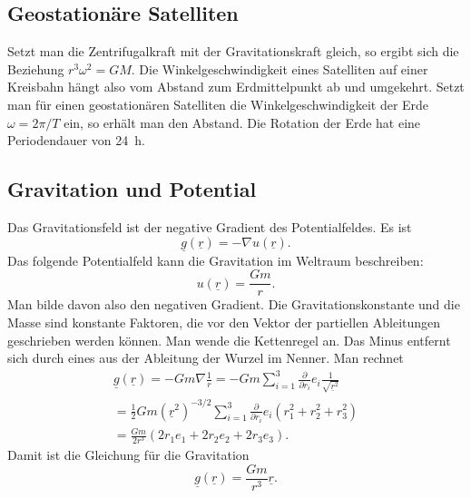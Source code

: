 \documentclass[a4paper,10pt,fleqn,twocolumn,twoside]{article}
\begin{document}
\subsection{Geostationäre Satelliten}

Setzt man die Zentrifugalkraft mit der Gravitationskraft gleich,
so ergibt sich die Beziehung \(r^3\omega^2=GM\). Die
Winkelgeschwindigkeit eines Satelliten auf einer Kreisbahn hängt also
vom Abstand zum Erdmittelpunkt ab und umgekehrt. Setzt man für einen
geostationären Satelliten die Winkelgeschwindigkeit der Erde
\(\omega=2\pi/T\) ein, so erhält man den Abstand. Die Rotation der
Erde hat eine Periodendauer von 24~h.

\subsection{Gravitation und Potential}

Das Gravitationsfeld ist der negative Gradient des Potentialfeldes.
Es ist
\[\underline g(\underline r) = -\nabla u(\underline r).\]
Das folgende Potentialfeld kann die Gravitation im Weltraum
beschreiben:
\[u(\underline r) = \frac{Gm}{r}.\]
Man bilde davon also den negativen Gradient. Die Gravitationskonstante
und die Masse sind konstante Faktoren, die vor den Vektor der
partiellen Ableitungen geschrieben werden können. Man wende die
Kettenregel an. Das Minus entfernt sich durch eines aus der
Ableitung der Wurzel im Nenner. Man rechnet
\begin{gather*}
\underline g(\underline r)
= -Gm\nabla\frac{1}{r}
= -Gm\sum_{i=1}^3 \frac{\partial}{\partial r_i}
e_i \frac{1}{\sqrt{\underline r^2}}\\
= \frac{1}{2}Gm (\underline r^2)^{-3/2}
\sum_{i=1}^3 \frac{\partial}{\partial r_i} e_i (r_1^2+r_2^2+r_3^2)\\
= \frac{Gm}{2r^3}(2r_1e_1 + 2r_2e_2 + 2r_3e_3).
\end{gather*}
Damit ist die Gleichung für die Gravitation
\[\underline g(\underline r) = \frac{Gm}{r^3} \underline r.\]
\end{document}
